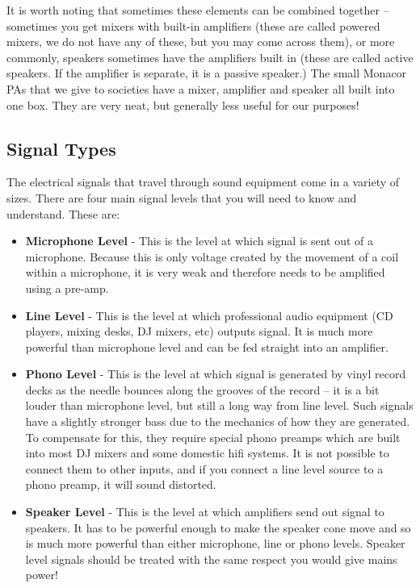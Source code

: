 \documentclass[14pt]{article} %
\let\Oldsubsection\subsection
\renewcommand{\subsection}{\FloatBarrier\Oldsubsection}
\begin{document}
It is worth noting that sometimes these elements can be combined together – sometimes you get mixers with built-in amplifiers (these are called powered mixers, we do not have any of these, but you may come across them), or more commonly, speakers sometimes have the amplifiers built in (these are called active speakers. If the amplifier is separate, it is a passive speaker.) The small Monacor PAs that we give to societies have a mixer, amplifier and speaker all built into one box. They are very neat, but generally less useful for our purposes!

\subsection{Signal Types}
\label{signal-types}
The electrical signals that travel through sound equipment come in a variety of sizes.
There are four main signal levels that you will need to know and understand. These are:

\begin{itemize}

\item \textbf{Microphone Level} - This is the level at which signal is sent out of a microphone. Because this is only voltage created by the movement of a coil within a microphone, it is very weak and therefore needs to be amplified using a pre-amp.

\item \textbf{Line Level} - This is the level at which professional audio equipment (CD players, mixing desks, DJ mixers, etc) outputs signal. It is much more powerful than microphone level and can be fed straight into an amplifier.

\item \textbf{Phono Level} - This is the level at which signal is generated by vinyl record decks as the needle bounces along the grooves of the record – it is a bit louder than microphone level, but still a long way from line level. Such signals have a
slightly stronger bass due to the mechanics of how they are generated. To compensate for this, they require special phono preamps which are built into most DJ mixers and some domestic hifi systems. It is not possible to connect them to other inputs, and if you connect a line level source to a phono preamp, it will sound distorted.

\item \textbf{Speaker Level} - This is the level at which amplifiers send out signal to speakers. It has to be powerful enough to make the speaker cone move and so is much more powerful than either microphone, line or phono levels. Speaker level signals should be treated with the same respect you would give mains power!

\end{itemize}
\end{document}
